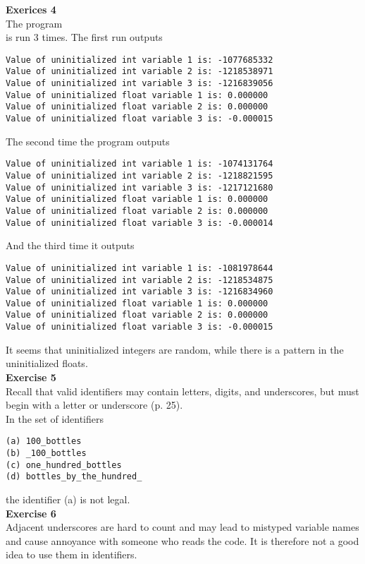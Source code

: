 \documentclass[a4paper, 10pt]{article}
\begin{document}
\textbf{Exerices 4} \\
The program \\
 
is run 3 times. The first run outputs 
\begin{lstlisting}
Value of uninitialized int variable 1 is: -1077685332
Value of uninitialized int variable 2 is: -1218538971
Value of uninitialized int variable 3 is: -1216839056
Value of uninitialized float variable 1 is: 0.000000
Value of uninitialized float variable 2 is: 0.000000
Value of uninitialized float variable 3 is: -0.000015
\end{lstlisting}
The second time the program outputs
\begin{lstlisting}
Value of uninitialized int variable 1 is: -1074131764
Value of uninitialized int variable 2 is: -1218821595
Value of uninitialized int variable 3 is: -1217121680
Value of uninitialized float variable 1 is: 0.000000
Value of uninitialized float variable 2 is: 0.000000
Value of uninitialized float variable 3 is: -0.000014
\end{lstlisting}
And the third time it outputs
\begin{lstlisting}
Value of uninitialized int variable 1 is: -1081978644
Value of uninitialized int variable 2 is: -1218534875
Value of uninitialized int variable 3 is: -1216834960
Value of uninitialized float variable 1 is: 0.000000
Value of uninitialized float variable 2 is: 0.000000
Value of uninitialized float variable 3 is: -0.000015
\end{lstlisting}
It seems that uninitialized integers are random, while there is a pattern in the uninitialized floats.\\

\textbf{Exercise 5} \\
Recall that valid identifiers may contain letters, digits, and underscores, but must begin with a letter or underscore (p. 25). \\

In the set of identifiers \\
\begin{lstlisting}
(a) 100_bottles
(b) _100_bottles
(c) one_hundred_bottles
(d) bottles_by_the_hundred_
\end{lstlisting}
the identifier (a) is not legal. \\

\textbf{Exercise 6} \\
Adjacent underscores are hard to count and may lead to mistyped variable names and cause annoyance with someone who reads the code. It is therefore not a good idea to use them in identifiers. \\
\end{document}
